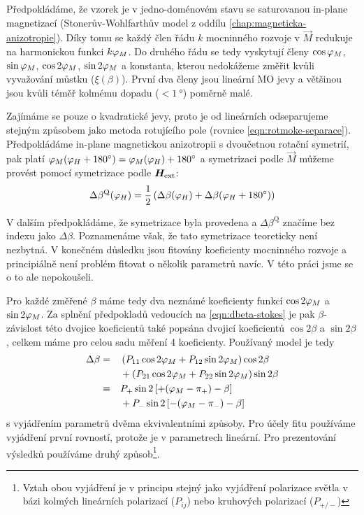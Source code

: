 Předpokládáme, že vzorek je v jedno-doménovém stavu se saturovanou in-plane magnetizací (Stonerův-Wohlfarthův model z oddílu \ref{chap:magneticka-anizotropie}).
Díky tomu se každý člen řádu $k$ mocninného rozvoje v $\vec{M}$ redukuje na harmonickou funkci $k\varphi_M$.
Do druhého řádu se tedy vyskytují členy $\cos\varphi_M$, $\sin\varphi_M$, $\cos2\varphi_M$, $\sin2\varphi_M$ a konstanta, kterou nedokážeme změřit kvůli vyvažování můstku ($\xi(\beta)$).
První dva členy jsou lineární MO jevy a většinou jsou kvůli téměř kolmému dopadu ($< \SI{1}{\degree}$) poměrně malé.

Zajímáme se pouze o kvadratické jevy, proto je od lineárních odseparujeme stejným způsobem jako metoda rotujícího pole (rovnice \eqref{eqn:rotmoke-separace}).
Předpokládáme in-plane magnetickou anizotropii s dvoučetnou rotační symetrií, pak platí $\varphi_M(\varphi_H+\SI{180}{\degree})=\varphi_M(\varphi_H)+\SI{180}{\degree}$ a symetrizaci podle $\vec{M}$ můžeme provést pomocí symetrizace podle $\bm{H}_\textrm{ext}$:
\begin{equation}
    \label{eqn:symetrizace-H}
    \Delta\beta^\textrm{Q}(\varphi_H) = \frac{1}{2}\left(\Delta\beta(\varphi_H) + \Delta\beta(\varphi_H+\SI{180}{\degree})\right)
\end{equation}

V dalším předpokládáme, že symetrizace byla provedena a $\Delta\beta^\textrm{Q}$ značíme bez indexu jako $\Delta\beta$.
Poznamenáme však, že tato symetrizace teoreticky není nezbytná.
V konečném důsledku jsou fitovány koeficienty mocninného rozvoje a principiálně není problém fitovat o několik parametrů navíc.
V této práci jsme se o to ale nepokoušeli.

Pro každé změřené $\beta$ máme tedy dva neznámé koeficienty funkcí $\cos2\varphi_M$ a $\sin2\varphi_M$.
Za splnění předpokladů vedoucích na \eqref{eqn:dbeta-stokes} je pak $\beta$-závislost této dvojice koeficientů také popsána dvojicí koeficientů $\cos2\beta$ a $\sin2\beta$, celkem máme pro celou sadu měření 4 koeficienty.
Používaný model je tedy
\begin{alignat}{2}
    \label{eqn:PMLD-matice}
    \Delta\beta &= && \left(P_{11} \cos2\varphi_M + P_{12}\sin2\varphi_M\right)\cos2\beta \\
                    & && + \left(P_{21}\cos2\varphi_M + P_{22}\sin2\varphi_M\right)\sin2\beta \\
                    &\equiv & & P_+ \sin2\left[+(\varphi_M -\pi_+) - \beta\right] \\
                    &  & & + P_- \sin2\left[-(\varphi_M-\pi_-) - \beta\right]
\end{alignat}
s vyjádřením parametrů dvěma ekvivalentními způsoby.
Pro účely fitu používáme vyjádření první rovností, protože je v parametrech lineární.
Pro prezentování výsledků používáme druhý způsob\footnote{Vztah obou vyjádření je v principu stejný jako vyjádření polarizace světla v bázi kolmých lineárních polarizací ($P_{ij}$) nebo kruhových polarizací ($P_{+/-}$)}.

